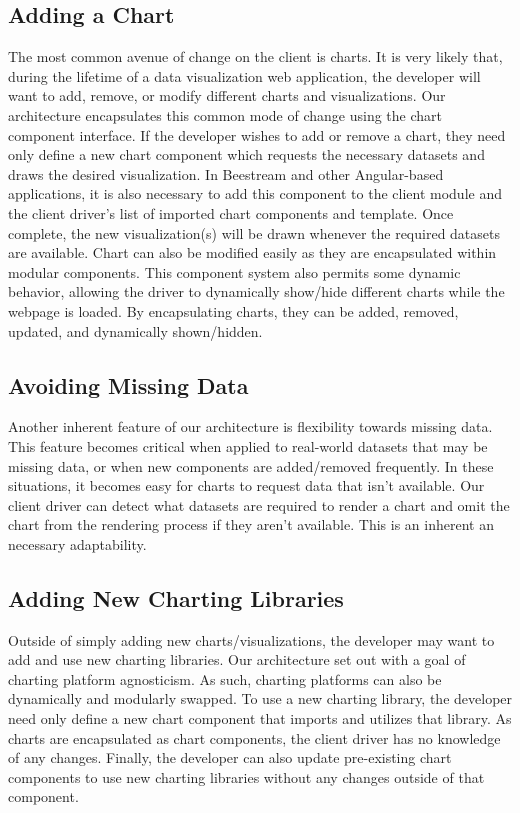 %
%

\subsection{Adding a Chart}

The most common avenue of change on the client is charts.  It is very likely that, during the lifetime of a data visualization web application, the developer will want to add, remove, or modify different charts and visualizations.  Our architecture encapsulates this common mode of change using the chart component interface.  If the developer wishes to add or remove a chart, they need only define a new chart component which requests the necessary datasets and draws the desired visualization.  In Beestream and other Angular-based applications, it is also necessary to add this component to the client module and the client driver’s list of imported chart components and template.  Once complete, the new visualization(s) will be drawn whenever the required datasets are available.  Chart can also be modified easily as they are encapsulated within modular components.  This component system also permits some dynamic behavior, allowing the driver to dynamically show/hide different charts while the webpage is loaded.  By encapsulating charts, they can be added, removed, updated, and dynamically shown/hidden. \par

\subsection{Avoiding Missing Data}
Another inherent feature of our architecture is flexibility towards missing data.  This feature becomes critical when applied to real-world datasets that may be missing data, or when new components are added/removed frequently.  In these situations, it becomes easy for charts to request data that isn’t available. Our client driver can detect what datasets are required to render a chart and omit the chart from the rendering process if they aren’t available.  This is an inherent an necessary adaptability. \par

\subsection{Adding New Charting Libraries}
Outside of simply adding new charts/visualizations, the developer may want to add and use new charting libraries.  Our architecture set out with a goal of charting platform agnosticism.  As such, charting platforms can also be dynamically and modularly swapped.  To use a new charting library, the developer need only define a new chart component that imports and utilizes that library.  As charts are encapsulated as chart components, the client driver has no knowledge of any changes.  Finally, the developer can also update pre-existing chart components to use new charting libraries without any changes outside of that component. \par
